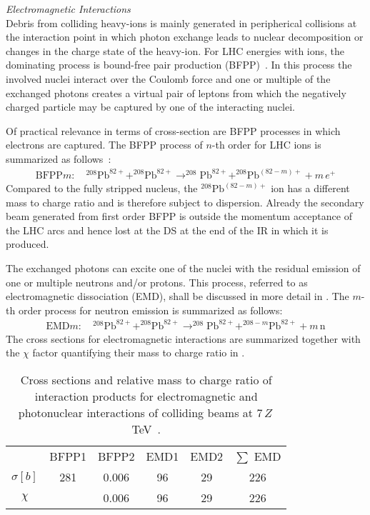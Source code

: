 \textit{Electromagnetic Interactions}\\
Debris from colliding heavy-ions is mainly generated in peripherical collisions at the interaction point in which photon exchange leads to nuclear decomposition or changes in the charge state of the heavy-ion. For LHC energies with \lead ions, the dominating process is bound-free pair production (BFPP)~\cite{}. In this process the involved nuclei interact over the Coulomb force and one or multiple of the exchanged photons creates a virtual pair of leptons from which the negatively charged particle may be captured by one of the interacting nuclei. 

Of practical relevance in terms of cross-section are BFPP processes in which electrons are captured. The BFPP process of $n$-th order for LHC \lead ions is summarized as follows~\cite{BFPP1}:
%
\begin{align}
  \text{BFPP}m:  \quad ^{208}\text{Pb}^{82+} + ^{208}\text{Pb}^{82+} \rightarrow ^{208}\text{Pb}^{82+} + ^{208}\text{Pb}^{(82-m)+} + m \, e^+
\end{align}
%
Compared to the fully stripped nucleus, the $^{208}\text{Pb}^{(82-m)+}$ ion has a different mass to charge ratio and is therefore subject to dispersion. Already the secondary beam generated from first order BFPP is outside the momentum acceptance of the LHC arcs and hence lost at the DS at the end of the IR in which it is produced. 

The exchanged photons can excite one of the nuclei with the residual emission of one or multiple neutrons and/or protons. This process, referred to as electromagnetic dissociation (EMD), shall be discussed in more detail in . The $m$-th order process for neutron emission is summarized as follows:
%
\begin{align}
   \text{EMD}m:  \quad ^{208}\text{Pb}^{82+} + ^{208}\text{Pb}^{82+} \rightarrow ^{208}\text{Pb}^{82+} + ^{208-m}\text{Pb}^{82+} + m \, \text{n}
\end{align}
%
The cross sections for electromagnetic interactions are summarized together with the $\chi$ factor quantifying their mass to charge ratio in . 

\begin{table}[h]
\centering
\caption{Cross sections and relative mass to charge ratio of interaction products for electromagnetic and photonuclear interactions of colliding \lead beams at 7$\,Z\,$TeV~\cite{schaum:thesis}.}
\label{tab:BFPP_cross_section}
\begin{tabular}{cccccc}
\toprule
 & BFPP1 & BFPP2 & EMD1 & EMD2 & $\sum$ EMD  \\
$\sigma [b]$ & 281 & 0.006 & 96  & 29 & 226 \\ 
$\chi  $  &  & 0.006 & 96  & 29 & 226 \\ \bottomrule
\end{tabular}
\end{table}

